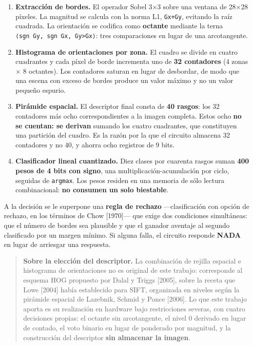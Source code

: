 \begin{enumerate}
\def\labelenumi{\arabic{enumi}.}
\item
  \textbf{Extracción de bordes.} El operador Sobel 3×3 sobre una ventana
  de 28×28 píxeles. La magnitud se calcula con la norma L1,
  \texttt{\textbar{}Gx\textbar{}+\textbar{}Gy\textbar{}}, evitando la
  raíz cuadrada. La orientación se codifica como \textbf{octante}
  mediante la terna
  \texttt{⟨sgn\ Gy,\ sgn\ Gx,\ \textbar{}Gy\textbar{}\textgreater{}\textbar{}Gx\textbar{}⟩}:
  tres comparaciones en lugar de una arcotangente.
\item
  \textbf{Histograma de orientaciones por zona.} El cuadro se divide en
  cuatro cuadrantes y cada píxel de borde incrementa uno de \textbf{32
  contadores} (4 zonas × 8 octantes). Los contadores saturan en lugar de
  desbordar, de modo que una escena con exceso de bordes produce un
  valor máximo y no un valor pequeño espurio.
\item
  \textbf{Pirámide espacial.} El descriptor final consta de \textbf{40
  rasgos}: los 32 contadores más ocho correspondientes a la imagen
  completa. Estos ocho \textbf{no se cuentan: se derivan} sumando los
  cuatro cuadrantes, que constituyen una partición del cuadro. Es la
  razón por la que el circuito almacena 32 contadores y no 40, y ahorra
  ocho registros de 9 bits.
\item
  \textbf{Clasificador lineal cuantizado.} Diez clases por cuarenta
  rasgos suman \textbf{400 pesos de 4 bits con signo}, una
  multiplicación-acumulación por ciclo, seguidas de \texttt{argmax}. Los
  pesos residen en una memoria de sólo lectura combinacional: \textbf{no
  consumen un solo biestable}.
\end{enumerate}

A la decisión se le superpone una \textbf{regla de rechazo}
---clasificación con opción de rechazo, en los términos de Chow
{[}1970{]}--- que exige dos condiciones simultáneas: que el número de
bordes sea plausible y que el ganador aventaje al segundo clasificado
por un margen mínimo. Si alguna falla, el circuito responde
\textbf{NADA} en lugar de arriesgar una respuesta.

\begin{quote}
\textbf{Sobre la elección del descriptor.} La combinación de rejilla
espacial e histograma de orientaciones no es original de este trabajo:
corresponde al esquema HOG propuesto por Dalal y Triggs {[}2005{]},
sobre la receta que Lowe {[}2004{]} había establecido para SIFT,
organizada en niveles según la pirámide espacial de Lazebnik, Schmid y
Ponce {[}2006{]}. Lo que este trabajo aporta es su realización en
hardware bajo restricciones severas, con cuatro decisiones propias: el
octante sin arcotangente, el nivel 0 derivado en lugar de contado, el
voto binario en lugar de ponderado por magnitud, y la construcción del
descriptor \textbf{sin almacenar la imagen}.
\end{quote}

